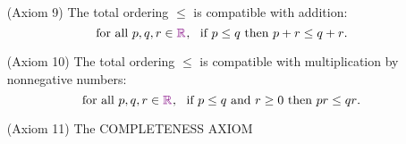 \documentclass[12pt]{amsart}
\newcommand{\R}{ {\color{violet} \mathbb{R}\hspace{.2mm} }}
\begin{document}
\begin{enumerate}
\medskip
\item[(Axiom 9)]  The total ordering $\leq$ is compatible with addition:
\[\text{for all $p,q,r\in \R$}, \ \  \text{if $p \leq q$ then $p + r \leq q + r$}.\] 
 
\item[(Axiom 10)]  The total ordering $\leq$ is compatible with multiplication by nonnegative numbers: 
\[\text{for all $p,q,r\in \R$}, \ \  \text{if $p \leq q$ and $r \geq 0$ then $pr \leq qr$}.\] 

\medskip

\item[(Axiom 11)] The {\color{olive}COMPLETENESS AXIOM}
\end{enumerate}
\end{document}
